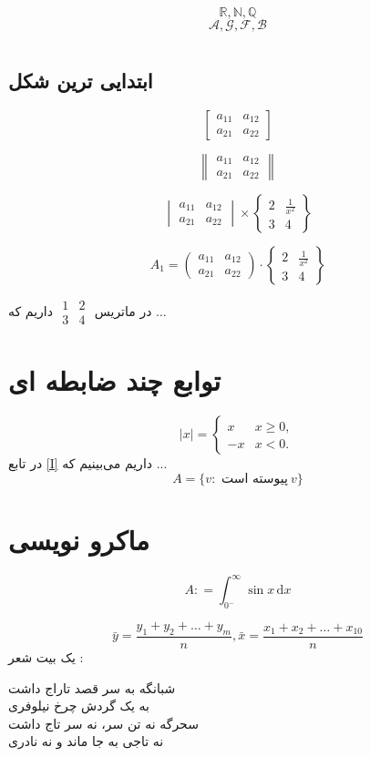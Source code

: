 \documentclass{book}
\newcommand{\dd}{\, \mathrm{d}}
\newcommand{\mian}[2]{\frac{#1_1 + #1_2 + \dots + #1_{#2}}{n}}
\begin{document}
\[
\mathbb{R, N, Q}
\]
\[
\mathcal{A, G, F, B}
\]

\chapter{}
\BNaz
\section{ابتدایی ترین شکل}
\[
\begin{bmatrix}
	a_{11} & a_{12}\\
	a_{21} & a_{22}
\end{bmatrix}
\]

\[
\begin{Vmatrix}
	a_{11} & a_{12}\\
	a_{21} & a_{22}
\end{Vmatrix}
\]

\[
\begin{vmatrix}
	a_{11} & a_{12}\\
	a_{21} & a_{22}
\end{vmatrix} \times
\begin{Bmatrix}
	2 & \tfrac{1}{x^2} \\
	3 & 4
\end{Bmatrix}
\]

\[
A_{1} =
\begin{pmatrix}
	a_{11} & a_{12}\\
	a_{21} & a_{22}
\end{pmatrix} \cdot 
\begin{Bmatrix}
	2 & \tfrac{1}{x^2} \\
	3 & 4
\end{Bmatrix}
\]

در ماتریس 
$
\begin{smallmatrix}
	1 & 2\\
	3 & 4
\end{smallmatrix}
$
داریم که $ \dots $
\chapter{توابع چند ضابطه ای}

\begin{equation} \label{I}
	|x| = 
	\begin{cases}
		x & x \ge 0, \\
	   -x & x < 0.
	\end{cases}
\end{equation}
در تابع \eqref{I} داریم می‌بینیم که ...
\[
A = \lbrace v: \text{ پیوسته است}\ v  \rbrace
\]

\chapter{ماکرو نویسی}
\[
A \colon = \int_{0^{-}}^{\infty} \sin x \dd x
\]

\[
\bar{y} = \mian{y}{m}, \bar{x} = \mian{x}{10}
\]
 	یک بیت شعر :
\begin{multicols}{2}
شبانگه به سر قصد تاراج داشت \\ به یک گردش چرخ نیلوفری 
	\\
سحرگه نه تن سر، نه سر تاج داشت \\ نه تاجی به جا ماند و نه نادری
\end{multicols}
\end{document}
